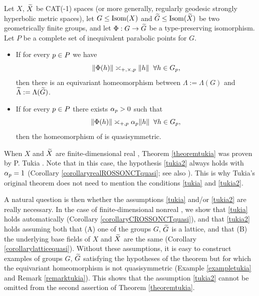 {\begin{theorem}
\label{theoremtukia}
Let $X$, $\widetilde X$ be CAT(-1) spaces (or more generally, regularly geodesic strongly hyperbolic metric spaces), let $G\leq\operatorname{Isom}(X)$ and $\widetilde G\leq\operatorname{Isom}(\widetilde X)$ be two geometrically finite groups, and let $\Phi:G\to \widetilde G$ be a type-preserving isomorphism. Let $P$ be a complete set of inequivalent parabolic points for $G$.
\begin{itemize}
\item[(i)] If for every $p\in P$ we have
\begin{equation}
\label{tukia}
\|\Phi(h)\| \asymp_{+,\times,p} \|h\| \;\;\forall h\in G_p,
\end{equation}
then there is an equivariant homeomorphism between $\Lambda := \Lambda(G)$ and $\widetilde\Lambda := \Lambda(\widetilde G)$.
\item[(ii)] If for every $p\in P$ there exists $\alpha_p > 0$ such that
\begin{equation}
\label{tukia2}
\|\Phi(h)\|  \asymp_{+,p} \alpha_p \|h\| \;\;\forall h\in G_p,
\end{equation}
then the homeomorphism of  is quasisymmetric.
\end{itemize}
\end{theorem}


When $X$ and $\widetilde X$ are finite-dimensional real \ROSSs, Theorem \ref{theoremtukia} was proven by P. Tukia \cite[Theorem 3.3]{Tukia2}. Note that in this case, the hypothesis \eqref{tukia2} always holds with $\alpha_p = 1$ (Corollary \ref{corollaryrealROSSONCTquasi}; see also \cite[Theorem 5.4.3]{Ratcliffe}). This is why Tukia's original theorem does not need to mention the conditions \eqref{tukia} and \eqref{tukia2}.

A natural question is then whether the assumptions \eqref{tukia} and/or \eqref{tukia2} are really necessary. In the case of finite-dimensional nonreal \ROSSs, we show that \eqref{tukia} holds automatically (Corollary \ref{corollaryCROSSONCTquasi}), and that \eqref{tukia2} holds assuming both that (A) one of the groups $G$, $\widetilde G$ is a lattice, and that (B) the underlying base fields of $X$ and $\widetilde X$ are the same (Corollary \ref{corollarylatticequasi}). Without these assumptions, it is easy to construct examples of groups $G$, $\widetilde G$ satisfying the hypotheses of the theorem but for which the equivariant homeomorphism is not quasisymmetric (Example \ref{exampletukia} and Remark \ref{remarktukia}). This shows that the assumption \eqref{tukia2} cannot be omitted from the second assertion of Theorem \ref{theoremtukia}.

}
